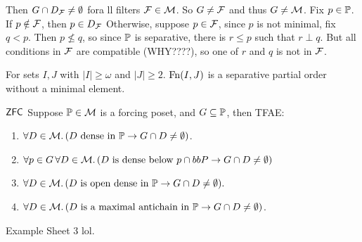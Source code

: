 \documentclass{article}
\begin{document}
Then $G \cap D_{\mathcal{F}} \neq \emptyset$ fora ll filters $\mathcal{F} \in \mathcal{M}$. So $G \neq \mathcal{F}$ and thus $G \neq \mathcal{M}$.
Fix $p \in \mathbb{P}$. If $p \notin \mathcal{F}$, then $p \in D_{\mathcal{F}}$ Otherwise, suppose $p \in \mathcal{F}$, since $p$ is not minimal, fix $q< p$. Then $p \nleq q$, so since $\mathbb{P}$ is separative, there is $r \leq p$ such that $r \perp q$. But all conditions in $\mathcal{F}$ are compatible (WHY????), so one of $r$ and $q$ is not in $\mathcal{F}$.
\endproof
\begin{fancyprop}{}
    For sets $I,J$ with $|I|\geq \omega$ and $|J| \geq 2$. $\operatorname{Fn}(I,J)$ is a separative partial order without a minimal element.
\end{fancyprop}
\begin{fancyprop}{$\mathsf{ZFC}$}
    Suppose $\mathbb{P} \in \mathcal{M}$ is a forcing poset, and $G \subseteq \mathbb{P}$, then TFAE: \begin{enumerate}
        \item[(i)] $\forall D \in \mathcal{M}. \, (D \text{ dense in }\mathbb{P} \rightarrow G \cap D \neq \emptyset)$.
        \item[(ii)] $\forall p \in G\, \forall D \in \mathcal{M}. \, (D \text{ is dense below }p \cap bbP \rightarrow G \cap D \neq \emptyset)$
        \item[(iii)] $\forall D \in \mathcal{M}.\, (D \text{ is open dense in } \mathbb{P} \rightarrow G \cap D \neq \emptyset).$
        \item[(iv)]$\forall D \in \mathcal{M}. \, (D \text{ is a maximal antichain in }\mathbb{P} \rightarrow G \cap D \neq \emptyset)$.
    \end{enumerate}
\end{fancyprop}
\proof Example Sheet 3 lol. \endproof
\end{document}
